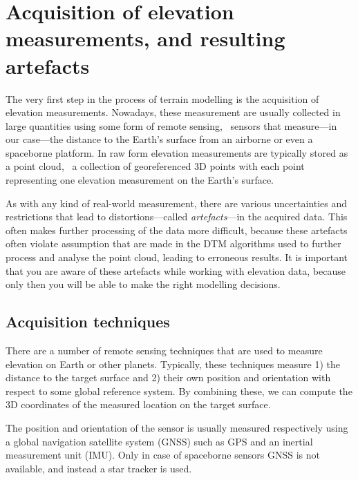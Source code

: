 
\graphicspath{{acquisition/}}

\chapter{Acquisition of elevation measurements, and resulting artefacts}
\label{chap:acquisition}

The very first step in the process of terrain modelling is the acquisition of elevation measurements. 
Nowadays, these measurement are usually collected in large quantities using some form of remote sensing, \ie\ sensors that measure---in our case---the distance to the Earth's surface from an airborne or even a spaceborne platform. 
In raw form elevation measurements are typically stored as a point cloud, \ie\ a collection of georeferenced 3D points with each point representing one elevation measurement on the Earth's surface.

As with any kind of real-world measurement, there are various uncertainties and restrictions that lead to distortions---called \emph{artefacts}---in the acquired data. 
This often makes further processing of the data more difficult, because these artefacts often violate assumption that are made in the DTM algorithms used to further process and analyse the point cloud, leading to erroneous results. 
It is important that you are aware of these artefacts while working with elevation data, because only then you will be able to make the right modelling decisions. 


\section{Acquisition techniques}
\label{sec:techniques}
There are a number of remote sensing techniques that are used to measure elevation on Earth or other planets. 
Typically, these techniques measure 1) the distance to the target surface and 2) their own position and orientation with respect to some global reference system. 
By combining these, we can compute the 3D coordinates of the measured location on the target surface. 

The position and orientation of the sensor is usually measured respectively using a global navigation satellite system (GNSS) such as GPS and an inertial measurement unit (IMU).
Only in case of spaceborne sensors GNSS is not available, and instead a star tracker is used.

